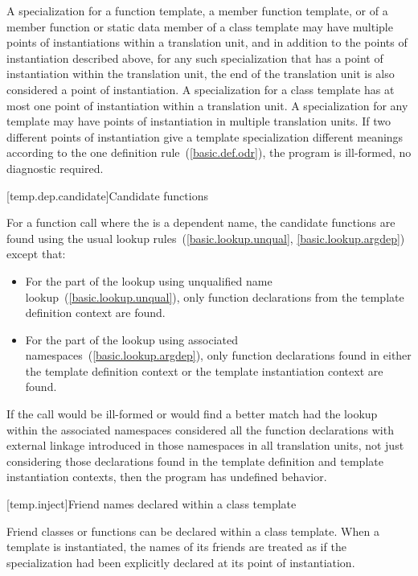 \pnum
A specialization for a function template, a member function template,
or of a member function or static data member of a class template may have
multiple points of instantiations within a translation unit, and in addition
to the points of instantiation described above, for any such specialization
that has a point of instantiation within the translation unit, the end of the
translation unit is also considered a point of instantiation.
A specialization for a class template has at most one point of instantiation
within a translation unit.
A specialization for any template may have points of instantiation in multiple
translation units.
If two different points of instantiation give a template specialization
different meanings according to the one definition rule~(\ref{basic.def.odr}),
the program is ill-formed, no diagnostic required.

[temp.dep.candidate]{Candidate functions}

\pnum
{}%
For a function call where the  is a
dependent name,
the candidate functions are found using the usual lookup
rules~(\ref{basic.lookup.unqual}, \ref{basic.lookup.argdep}) except that:

\begin{itemize}
\item
For the part of the lookup using unqualified name lookup~(\ref{basic.lookup.unqual}),
only function declarations
from the template definition context are found.
\item
For the part of the lookup using associated namespaces~(\ref{basic.lookup.argdep}),
only function declarations found in either the template
definition context or the template instantiation context are found.
\end{itemize}

If
the call would be ill-formed or would find a better match had the lookup
within the associated namespaces considered all the function declarations with
external linkage introduced in those namespaces in all translation units,
not just considering those declarations found in the template definition and
template instantiation contexts, then the program has undefined behavior.

[temp.inject]{Friend names declared within a class template}

\pnum
Friend classes or functions can be declared within a class template.
When a template is instantiated, the names of its friends are treated
as if the specialization had been explicitly declared at its point of
instantiation.

